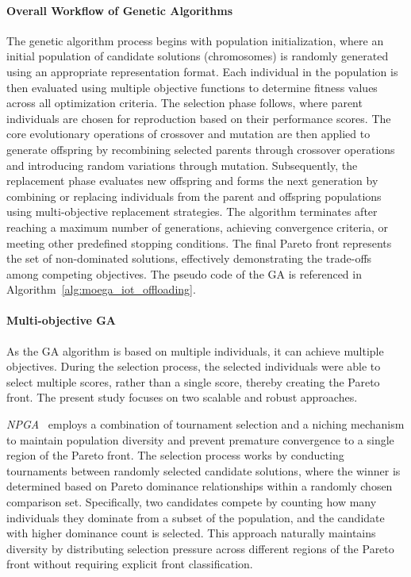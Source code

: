 \documentclass[preprint,3p,authoryear]{elsarticle}
\begin{document}
\paragraph{Overall Workflow of Genetic Algorithms}
The genetic algorithm process begins with population initialization, where an initial population of candidate solutions (chromosomes) is randomly generated using an appropriate representation format. Each individual in the population is then evaluated using multiple objective functions to determine fitness values across all optimization criteria. The selection phase follows, where parent individuals are chosen for reproduction based on their performance scores. The core evolutionary operations of crossover and mutation are then applied to generate offspring by recombining selected parents through crossover operations and introducing random variations through mutation. Subsequently, the replacement phase evaluates new offspring and forms the next generation by combining or replacing individuals from the parent and offspring populations using multi-objective replacement strategies. The algorithm terminates after reaching a maximum number of generations, achieving convergence criteria, or meeting other predefined stopping conditions. The final Pareto front represents the set of non-dominated solutions, effectively demonstrating the trade-offs among competing objectives. The pseudo code of the GA is referenced in Algorithm~\ref{alg:moega_iot_offloading}.

\paragraph{Multi-objective GA} As the GA algorithm is based on multiple individuals, it can achieve multiple objectives. During the selection process, the selected individuals were able to select multiple scores, rather than a single score, thereby creating the Pareto front. The present study focuses on two scalable and robust approaches. 

\emph{NPGA}~\citep{horn1994npga} employs a combination of tournament selection and a niching mechanism to maintain population diversity and prevent premature convergence to a single region of the Pareto front. The selection process works by conducting tournaments between randomly selected candidate solutions, where the winner is determined based on Pareto dominance relationships within a randomly chosen comparison set. Specifically, two candidates compete by counting how many individuals they dominate from a subset of the population, and the candidate with higher dominance count is selected. This approach naturally maintains diversity by distributing selection pressure across different regions of the Pareto front without requiring explicit front classification.
\end{document}
